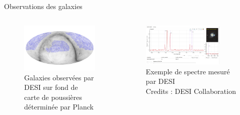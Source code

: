 \documentclass{beamer}
\newcommand{\credits}[1]{\tiny Credits : #1}
\begin{document}
\begin{frame}{Observations des galaxies}
\begin{columns}
\begin{column}{.5\textwidth}
	\begin{figure}
		\centering
	\includegraphics[width=\textwidth]{figures/desi_on_dust.png}
	\caption{Galaxies observées par DESI sur fond de carte de poussières déterminée par Planck}
	\end{figure}
\end{column}
\begin{column}{.5\textwidth}
	\begin{figure}
		\centering
		\includegraphics[width=0.8\textwidth]{figures/DESI_spec.png}
		\caption{Exemple de spectre mesuré par DESI\\ \credits{DESI Collaboration}}
	\end{figure}
\end{column}
\end{columns}
\end{frame}
\end{document}
